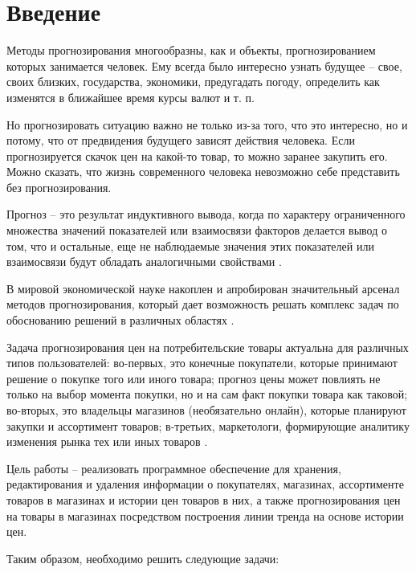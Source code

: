 \documentclass[a4paper,14pt]{extreport}
\begin{document}
	
\renewcommand{\contentsname}{Содержание}
\tableofcontents
\setcounter{page}{3}


\chapter*{Введение}

Методы прогнозирования многообразны, как и объекты, прогнозированием которых занимается человек. Ему всегда было интересно узнать будущее -- свое, своих близких, государства, экономики, предугадать погоду, определить как изменятся в ближайшее время курсы валют и т. п.

Но прогнозировать ситуацию важно не только из-за того, что это интересно, но и потому, что от предвидения будущего зависят действия человека. Если прогнозируется скачок цен на какой-то товар, то можно заранее закупить его. Можно сказать, что жизнь современного человека невозможно себе представить без прогнозирования.

Прогноз -- это результат индуктивного вывода, когда по характеру ограниченного множества значений показателей или взаимосвязи факторов делается вывод о том, что и остальные, еще не наблюдаемые значения этих показателей или взаимосвязи будут обладать аналогичными свойствами \cite{hse_pred}.

В мировой экономической науке накоплен и апробирован значительный арсенал методов прогнозирования, который дает возможность решать комплекс задач по обоснованию решений в различных областях \cite{bel_prog}.

Задача прогнозирования цен на потребительские товары актуальна для различных типов пользователей: во-первых, это конечные покупатели, которые принимают решение о покупке того или иного товара; прогноз цены может повлиять не только на выбор момента покупки, но и на сам факт покупки товара как таковой; во-вторых, это владельцы магазинов (необязательно онлайн), которые планируют закупки и ассортимент товаров; в-третьих, маркетологи, формирующие аналитику изменения рынка тех или иных товаров \cite{met_pred_online}.

Цель работы -- реализовать программное обеспечение для хранения, редактирования и удаления информации о покупателях, магазинах, ассортименте товаров в магазинах и истории цен товаров в них, а также прогнозирования цен на товары в магазинах посредством построения линии тренда на основе истории
цен.

Таким образом, необходимо решить следующие задачи:
\end{document}
